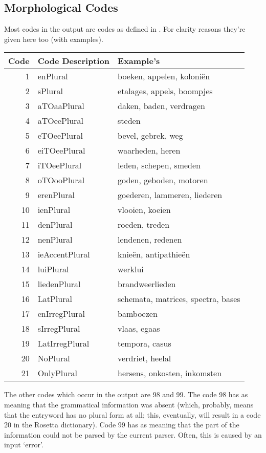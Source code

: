 \subsection{Morphological Codes}

Most codes in the output are codes as defined in \cite{HS:morph}. For 
clarity reasons they're given here too (with examples).

\begin{tabular}{|r|l|l|} \hline
 Code & Code Description & Example's\\ \hline
   1  & enPlural         & boeken, appelen, koloni\"{e}n\\
   2  & sPlural          & etalages, appels, boompjes\\
   3  & aTOaaPlural      & daken, baden, verdragen\\
   4  & aTOeePlural      & steden\\
   5  & eTOeePlural      & bevel, gebrek, weg\\
   6  & eiTOeePlural     & waarheden, heren\\
   7  & iTOeePlural      & leden, schepen, smeden\\
   8  & oTOooPlural      & goden, geboden, motoren\\
   9  & erenPlural       & goederen, lammeren, liederen\\
  10  & ienPlural        & vlooien, koeien\\
  11  & denPlural        & roeden, treden\\
  12  & nenPlural        & lendenen, redenen\\
  13  & ieAccentPlural   & knie\"{e}n, antipathie\"{e}n\\
  14  & luiPlural        & werklui\\
  15  & liedenPlural     & brandweerlieden\\
  16  & LatPlural        & schemata, matrices, spectra, bases\\
  17  & enIrregPlural    & bamboezen\\
  18  & sIrregPlural     & vlaas, egaas\\
  19  & LatIrregPlural   & tempora, casus\\
  20  & NoPlural         & verdriet, heelal\\
  21  & OnlyPlural       & hersens, onkosten, inkomsten\\ \hline
\end{tabular}

The other codes which occur in the output are 98 and 99. The code 98 has as 
meaning that the grammatical information was absent (which, probably, means that 
the entryword has no plural form at all; this, eventually, will result in a 
code 20 in the Rosetta dictionary). Code 99 has as meaning that the part of the
information could not be parsed by the current parser. Often, this is caused by
an input `error'.

